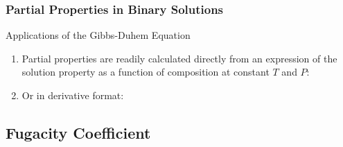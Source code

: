 \documentclass[10pt,compress,handout,ignorenonframetext,unknownkeysallowed]{beamer}
\begin{document}
\begin{frame}
  \frametitle{Partial Properties in Binary Solutions}
    \begin{block}{\begin{center}\normalsize{Applications of the Gibbs-Duhem Equation }\end{center}}
      \begin{enumerate}%
         \item<1->Partial properties are readily calculated directly from an expression of the solution property as a function of composition at constant $T$ and $P$:
         \item<2->Or in derivative format:
      \end{enumerate}
   \end{block}
\end{frame}
\normalsize




\subsection{Fugacity Coefficient}
\end{document}
